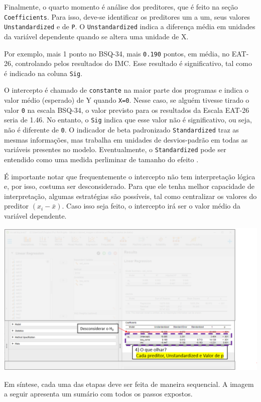 \documentclass[
]{book}
\begin{document}
Finalmente, o quarto momento é análise dos preditores, que é feito na seção \texttt{Coefficients}. Para isso, deve-se identificar os preditores um a um, seus valores \texttt{Unstandardized} e de \texttt{P}. O \texttt{Unstandardized} indica a diferença média em unidades da variável dependente quando se altera uma unidade de X.

Por exemplo, mais 1 ponto no BSQ-34, mais \texttt{0.190} pontos, em média, no EAT-26, controlando pelos resultados do IMC. Esse resultado é significativo, tal como é indicado na coluna \texttt{Sig}.

O intercepto é chamado de \texttt{constante} na maior parte dos programas e indica o valor médio (esperado) de Y quando \texttt{X=0}. Nesse caso, se alguém tivesse tirado o valor \texttt{0} na escala BSQ-34, o valor previsto para os resultados da Escala EAT-26 seria de 1.46. No entanto, o \texttt{Sig} indica que esse valor não é significativo, ou seja, não é diferente de \texttt{0}. O indicador de beta padronizado \texttt{Standardized} traz as mesmas informações, mas trabalha em unidades de desvios-padrão em todas as variáveis presentes no modelo. Eventualmente, o \texttt{Standardized} pode ser entendido como uma medida perliminar de tamanho do efeito \citep{fox2016}.

É importante notar que frequentemente o intercepto não tem interpretação lógica e, por isso, costuma ser desconsiderado. Para que ele tenha melhor capacidade de interpretação, algumas estratégias são possíveis, tal como centralizar os valores do preditor \((x_i-\bar{x})\). Caso isso seja feito, o intercepto irá ser o valor médio da variável dependente.

\includegraphics{./img/cap_reg_multipla_resultado_4.png}

Em síntese, cada uma das etapas deve ser feita de maneira sequencial. A imagem a seguir apresenta um sumário com todos os passos expostos.
\end{document}
